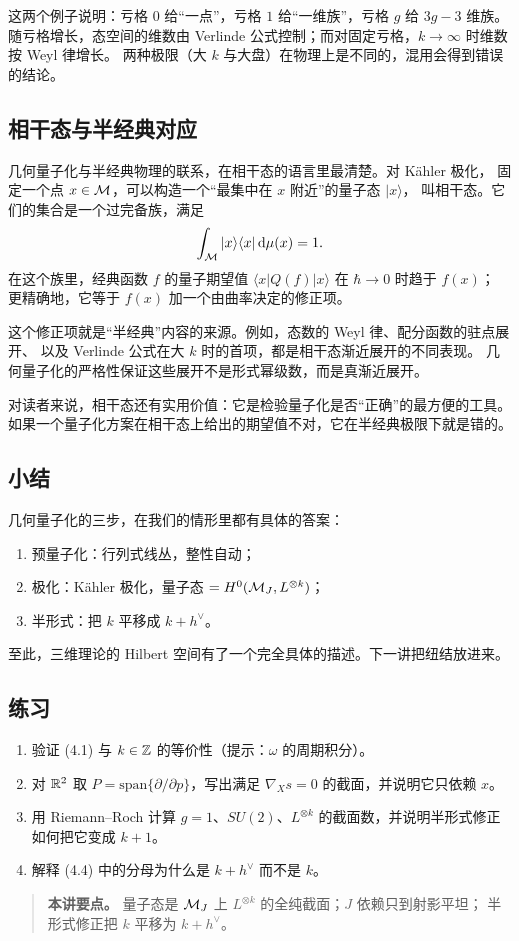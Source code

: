 这两个例子说明：亏格 $0$ 给“一点”，亏格 $1$ 给“一维族”，亏格 $g$ 给 $3g-3$ 维族。
随亏格增长，态空间的维数由 Verlinde 公式控制；而对固定亏格，$k\to\infty$ 时维数按 Weyl 律增长。
两种极限（大 $k$ 与大盘）在物理上是不同的，混用会得到错误的结论。

\subsection{相干态与半经典对应}

几何量子化与半经典物理的联系，在相干态的语言里最清楚。对 Kähler 极化，
固定一个点 $x\in\mathcal{M}$，可以构造一个“最集中在 $x$ 附近”的量子态 $|x\rangle$，
叫相干态。它们的集合是一个过完备族，满足
\[
\int_{\mathcal{M}} |x\rangle\langle x|\,\mathrm{d}\mu(x)=1 .
\]
在这个族里，经典函数 $f$ 的量子期望值 $\langle x|Q(f)|x\rangle$ 在 $\hbar\to0$ 时趋于 $f(x)$；
更精确地，它等于 $f(x)$ 加一个由曲率决定的修正项。

这个修正项就是“半经典”内容的来源。例如，态数的 Weyl 律、配分函数的驻点展开、
以及 Verlinde 公式在大 $k$ 时的首项，都是相干态渐近展开的不同表现。
几何量子化的严格性保证这些展开不是形式幂级数，而是真渐近展开。

对读者来说，相干态还有实用价值：它是检验量子化是否“正确”的最方便的工具。
如果一个量子化方案在相干态上给出的期望值不对，它在半经典极限下就是错的。

\subsection{小结}

几何量子化的三步，在我们的情形里都有具体的答案：
\begin{enumerate}[leftmargin=*]
  \item 预量子化：行列式线丛，整性自动；
  \item 极化：Kähler 极化，量子态 $=H^0(\mathcal{M}_J,L^{\otimes k})$；
  \item 半形式：把 $k$ 平移成 $k+h^\vee$。
\end{enumerate}
至此，三维理论的 Hilbert 空间有了一个完全具体的描述。下一讲把纽结放进来。

\subsection*{练习}
\begin{enumerate}[leftmargin=*]
  \item 验证 (4.1) 与 $k\in\mathbb{Z}$ 的等价性（提示：$\omega$ 的周期积分）。
  \item 对 $\mathbb{R}^2$ 取 $P=\mathrm{span}\{\partial/\partial p\}$，写出满足 $\nabla_Xs=0$ 的截面，并说明它只依赖 $x$。
  \item 用 Riemann--Roch 计算 $g=1$、$SU(2)$、$L^{\otimes k}$ 的截面数，并说明半形式修正如何把它变成 $k+1$。
  \item 解释 (4.4) 中的分母为什么是 $k+h^\vee$ 而不是 $k$。
\end{enumerate}

\begin{quote}
\small
\textbf{本讲要点。} 量子态是 $\mathcal{M}_J$ 上 $L^{\otimes k}$ 的全纯截面；$J$ 依赖只到射影平坦；
半形式修正把 $k$ 平移为 $k+h^\vee$。
\end{quote}
